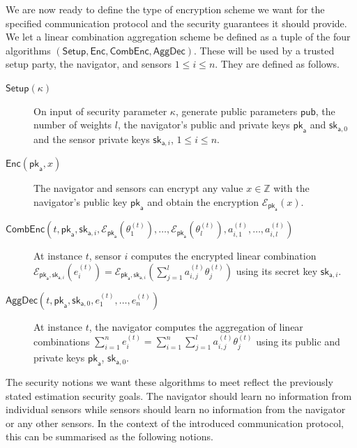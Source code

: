 We are now ready to define the type of encryption scheme we want for the specified communication protocol and the security guarantees it should provide. We let a linear combination aggregation scheme be defined as a tuple of the four algorithms $(\mathsf{Setup}, \mathsf{Enc}, \mathsf{CombEnc}, \mathsf{AggDec})$. These will be used by a trusted setup party, the navigator, and sensors $1\leq i\leq n$. They are defined as follows.
\begin{description}
    \item[$\mathsf{Setup}(\kappa)$] On input of security parameter $\kappa$, generate public parameters $\mathsf{pub}$, the number of weights $l$, the navigator's public and private keys $\mathsf{pk}_{\mathsf{a}}$ and $\mathsf{sk}_{\mathsf{a},0}$ and the sensor private keys $\mathsf{sk}_{\mathsf{a},i}$, $1\leq i\leq n$.
    \item[$\mathsf{Enc}(\mathsf{pk}_{\mathsf{a}}, x)$] The navigator and sensors can encrypt any value $x\in\mathbb{Z}$ with the navigator's public key $\mathsf{pk}_{\mathsf{a}}$ and obtain the encryption $\mathcal{E}_{\mathsf{pk}_{\mathsf{a}}}(x)$.
    \item[$\mathsf{CombEnc}(t, \mathsf{pk}_{\mathsf{a}}, \mathsf{sk}_{\mathsf{a},i}, \mathcal{E}_{\mathsf{pk}_{\mathsf{a}}}(\theta_1^{(t)}),\dots,\mathcal{E}_{\mathsf{pk}_{\mathsf{a}}}(\theta_l^{(t)}), a^{(t)}_{i,1},\dots,a^{(t)}_{i,l})$] At instance $t$, sensor $i$ computes the encrypted linear combination $\mathcal{E}_{\mathsf{pk}_{\mathsf{a}},\mathsf{sk}_{\mathsf{a},i}}(e^{(t)}_i) = \mathcal{E}_{\mathsf{pk}_{\mathsf{a}},\mathsf{sk}_{\mathsf{a},i}}(\sum^l_{j=1}a^{(t)}_{i,j}\theta^{(t)}_j)$ using its secret key $\mathsf{sk}_{\mathsf{a},i}$.
    \item[$\mathsf{AggDec}(t, \mathsf{pk}_{\mathsf{a}}, \mathsf{sk}_{\mathsf{a},0}, e^{(t)}_1,\dots,e^{(t)}_n)$] At instance $t$, the navigator computes the aggregation of linear combinations $\sum^{n}_{i=1}e_i^{(t)}=\sum^{n}_{i=1}\sum^{l}_{j=1} a^{(t)}_{i,j}\theta^{(t)}_j$ using its public and private keys $\mathsf{pk}_{\mathsf{a}}$, $\mathsf{sk}_{\mathsf{a},0}$.
\end{description}
The security notions we want these algorithms to meet reflect the previously stated estimation security goals. The navigator should learn no information from individual sensors while sensors should learn no information from the navigator or any other sensors. In the context of the introduced communication protocol, this can be summarised as the following notions.
